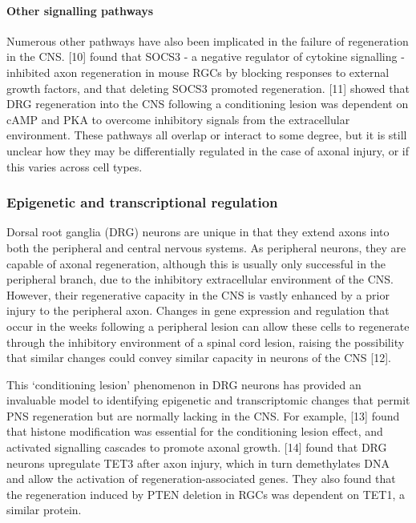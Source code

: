 \documentclass[
  12pt,
  a4paper,
]{article}
\begin{document}
\hypertarget{other-signalling-pathways}{%
\paragraph{Other signalling pathways}\label{other-signalling-pathways}}

Numerous other pathways have also been implicated in the failure of
regeneration in the CNS. {[}10{]} found that SOCS3 - a negative
regulator of cytokine signalling - inhibited axon regeneration in mouse
RGCs by blocking responses to external growth factors, and that deleting
SOCS3 promoted regeneration. {[}11{]} showed that DRG regeneration into
the CNS following a conditioning lesion was dependent on cAMP and PKA to
overcome inhibitory signals from the extracellular environment. These
pathways all overlap or interact to some degree, but it is still unclear
how they may be differentially regulated in the case of axonal injury,
or if this varies across cell types.

\hypertarget{epigenetic-and-transcriptional-regulation}{%
\subsubsection{Epigenetic and transcriptional
regulation}\label{epigenetic-and-transcriptional-regulation}}

Dorsal root ganglia (DRG) neurons are unique in that they extend axons
into both the peripheral and central nervous systems. As peripheral
neurons, they are capable of axonal regeneration, although this is
usually only successful in the peripheral branch, due to the inhibitory
extracellular environment of the CNS. However, their regenerative
capacity in the CNS is vastly enhanced by a prior injury to the
peripheral axon. Changes in gene expression and regulation that occur in
the weeks following a peripheral lesion can allow these cells to
regenerate through the inhibitory environment of a spinal cord lesion,
raising the possibility that similar changes could convey similar
capacity in neurons of the CNS {[}12{]}.

This `conditioning lesion' phenomenon in DRG neurons has provided an
invaluable model to identifying epigenetic and transcriptomic changes
that permit PNS regeneration but are normally lacking in the CNS. For
example, {[}13{]} found that histone modification was essential for the
conditioning lesion effect, and activated signalling cascades to promote
axonal growth. {[}14{]} found that DRG neurons upregulate TET3 after
axon injury, which in turn demethylates DNA and allow the activation of
regeneration-associated genes. They also found that the regeneration
induced by PTEN deletion in RGCs was dependent on TET1, a similar
protein.
\end{document}
